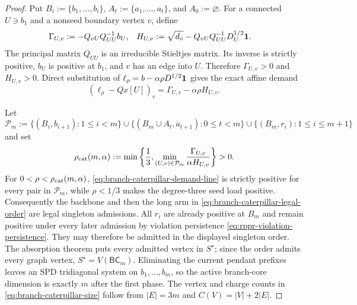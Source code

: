 \begin{proof}
Put $B_i:=\{b_1,\ldots,b_i\}$,
$A_t:=\{a_1,\ldots,a_t\}$, and $A_0:=\varnothing$.  For a connected
$U\ni b_1$ and a nonseed boundary vertex $v$, define
\begin{align}
 \Gamma_{U,v}
 &:=-Q_{vU}Q_{UU}^{-1}b_U,
 &
 H_{U,v}
 &:=\sqrt{d_v}-Q_{vU}Q_{UU}^{-1}D_U^{1/2}\mathbf{1}.
 \label{eq:branch-caterpillar-affine-demand}
\end{align}
The principal matrix $Q_{UU}$ is an irreducible Stieltjes matrix.  Its inverse
is strictly positive, $b_U$ is positive at $b_1$, and $v$ has an edge into
$U$.  Therefore $\Gamma_{U,v}>0$ and $H_{U,v}>0$.  Direct substitution of
$\ell_\rho=b-\alpha\rho D^{1/2}\mathbf{1}$ gives the exact affine demand
\begin{equation}
 (\ell_\rho-Qx[U])_v
 =\Gamma_{U,v}-\alpha\rho H_{U,v}.
 \label{eq:branch-caterpillar-demand-line}
\end{equation}

Let
\begin{equation*}
 \mathcal P_m:=
 \{(B_i,b_{i+1}):1\leq i<m\}
 \cup\{(B_m\cup A_t,a_{t+1}):0\leq t<m\}
 \cup\{(B_m,r_i):1\leq i\leq m+1\}
\end{equation*}
and set
\begin{equation}
 \rho_{\rm cat}(m,\alpha)
 :=\min\left\{
  \frac13,
  \min_{(U,v)\in\mathcal P_m}
  \frac{\Gamma_{U,v}}{\alpha H_{U,v}}
 \right\}>0.
 \label{eq:branch-caterpillar-reach-threshold}
\end{equation}
For $0<\rho<\rho_{\rm cat}(m,\alpha)$,
\eqref{eq:branch-caterpillar-demand-line} is strictly positive for every pair
in $\mathcal P_m$, while $\rho<1/3$ makes the degree-three seed load positive.
Consequently the backbone and then the long arm in
\eqref{eq:branch-caterpillar-legal-order} are legal singleton admissions.
All $r_i$ are already positive at $B_m$ and remain positive under every later
admission by violation persistence
\eqref{eq:rppr-violation-persistence}.  They may therefore be admitted in the
displayed singleton order.  The absorption theorem puts every admitted vertex
in $S^\star$; since the order admits every graph vertex,
$S^\star=V(\mathsf{BC}_m)$.  Eliminating the current pendant prefixes leaves
an SPD tridiagonal system on $b_1,\ldots,b_m$, so the active branch-core
dimension is exactly $m$ after the first phase.  The vertex and charge counts
in \eqref{eq:branch-caterpillar-size} follow from
$|E|=3m$ and $C(V)=|V|+2|E|$.


\end{proof}
